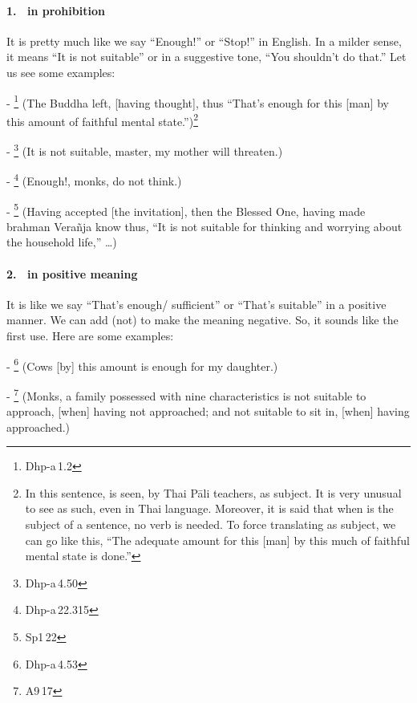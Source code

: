 \paragraph*{1.\  in prohibition} It is pretty much like we say ``Enough!'' or ``Stop!'' in English. In a milder sense, it means ``It is not suitable'' or in a suggestive tone, ``You shouldn't do that.'' Let us see some examples:\par
- \footnote{Dhp-a\,1.2} (The Buddha left, [having thought], thus ``That's enough for this [man] by this amount of faithful mental state.'')\footnote{In this sentence,  is seen, by Thai P\=ali teachers, as subject. It is very unusual to see as such, even in Thai language. Moreover, it is said that when  is the subject of a sentence, no verb is needed. To force translating  as subject, we can go like this, ``The adequate amount for this [man] by this much of faithful mental state is done.''}\par
- \footnote{Dhp-a\,4.50} (It is not suitable, master, my mother will threaten.)\par
- \footnote{Dhp-a\,22.315} (Enough!, monks, do not think.)\par
- \footnote{Sp1\,22} (Having accepted [the invitation], then the Blessed One, having made brahman Vera\~nja know thus, ``It is not suitable for thinking and worrying about the household life,'' \ldots)\par

\paragraph*{2.\  in positive meaning} It is like we say ``That's enough/ sufficient'' or ``That's suitable'' in a positive manner. We can add  (not) to make the meaning negative. So, it sounds like the first use. Here are some examples:\par
- \footnote{Dhp-a\,4.53} (Cows [by] this amount is enough for my daughter.)\par
- \footnote{A9\,17} (Monks, a family possessed with nine characteristics is not suitable to approach, [when] having not approached; and not suitable to sit in, [when] having approached.)\par

